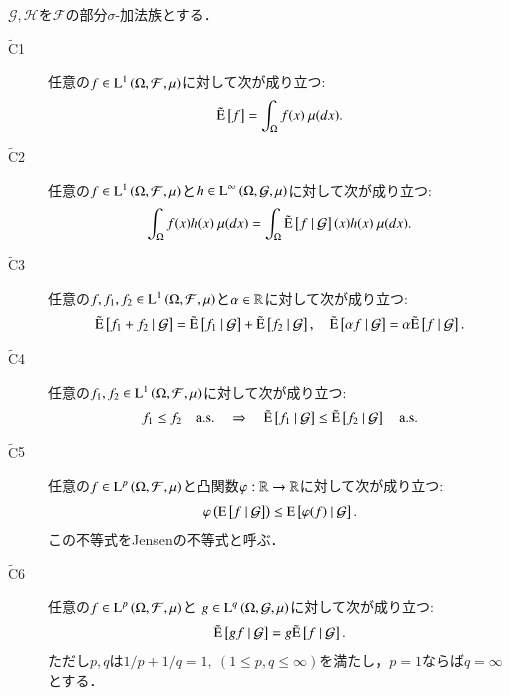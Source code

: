	\begin{screen}
		\begin{prp}[拡張条件付き期待値の性質]
		$\mathcal{G},\mathcal{H}$を$\mathcal{F}$の部分$\sigma$-加法族とする．
		\begin{description}
			\item[$\tilde{\mathrm{C}}$1] 任意の$f \in \operatorname{L}^{1} \left(\Omega, \mathcal{F},\mu\right)$に対して次が成り立つ:
				\begin{align}
					\tilde{\operatorname{E}} \left[ f \right] = \int_{\Omega} f(x)\ \mu(dx).
				\end{align}
				
			\item[$\tilde{\mathrm{C}}$2]	任意の$f \in \operatorname{L}^{1} \left(\Omega, \mathcal{F},\mu\right)$と$h \in \operatorname{L}^{\infty} \left(\Omega, \mathcal{G},\mu\right)$に対して次が成り立つ:
				\begin{align}
					\int_{\Omega} f(x)h(x)\ \mu(dx) = \int_{\Omega} \tilde{\operatorname{E}} \left[ f \ \middle|\ \mathcal{G} \right](x)h(x)\ \mu(dx).
				\end{align}
				
			\item[$\tilde{\mathrm{C}}$3]	任意の$f,f_1,f_2 \in \operatorname{L}^{1} \left(\Omega, \mathcal{F},\mu\right)$と$\alpha \in \mathbb{R}$に対して次が成り立つ:
				\begin{align}
					\tilde{\operatorname{E}} \left[ f_1 + f_2 \ \middle|\ \mathcal{G} \right] = \tilde{\operatorname{E}} \left[ f_1 \ \middle|\ \mathcal{G} \right] + \tilde{\operatorname{E}} \left[ f_2 \ \middle|\ \mathcal{G} \right],
					\quad \tilde{\operatorname{E}} \left[ \alpha f \ \middle|\ \mathcal{G} \right] = \alpha \tilde{\operatorname{E}} \left[ f \ \middle|\ \mathcal{G} \right].
				\end{align}

			\item[$\tilde{\mathrm{C}}$4]	任意の$f_1,f_2 \in \operatorname{L}^{1} \left(\Omega, \mathcal{F},\mu\right)$に対して次が成り立つ:
				\begin{align}
					f_1 \leq f_2 \quad \mathrm{a.s.} \quad \Rightarrow \quad \tilde{\operatorname{E}} \left[ f_1 \ \middle|\ \mathcal{G} \right] \leq \tilde{\operatorname{E}} \left[ f_2 \ \middle|\ \mathcal{G} \right] \quad \mathrm{a.s.}
				\end{align}
			
			\item[$\tilde{\mathrm{C}}$5] 任意の$f \in \operatorname{L}^{p} \left(\Omega, \mathcal{F},\mu\right)$と凸関数$\varphi:\mathbb{R} \rightarrow \mathbb{R}$に対して次が成り立つ:
				\begin{align}
					\varphi\left( \operatorname{E} \left[ f \ \middle|\ \mathcal{G} \right] \right) \leq \operatorname{E} \left[ \varphi(f) \ \middle|\ \mathcal{G} \right].
				\end{align}
				この不等式をJensenの不等式と呼ぶ．
				
			\item[$\tilde{\mathrm{C}}$6]	任意の$f \in \operatorname{L}^{p} \left(\Omega, \mathcal{F},\mu\right)$と
				$g \in \operatorname{L}^{q} \left(\Omega, \mathcal{G},\mu\right)$に対して次が成り立つ:
				\begin{align}
					\tilde{\operatorname{E}} \left[ gf \ \middle|\ \mathcal{G} \right] = g\tilde{\operatorname{E}} \left[ f \ \middle|\ \mathcal{G} \right].
				\end{align}
				ただし$p,q$は$1/p + 1/q = 1,\ (1 \leq p,q \leq \infty)$を満たし，$p = 1$ならば$q = \infty$とする．
				

\end{description}
\end{prp}
\end{screen}
